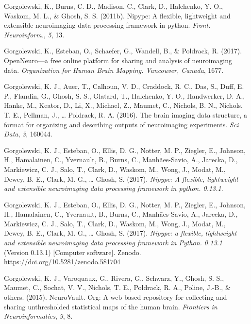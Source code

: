 \documentclass[11pt,american,a4paper,oneside,]{memoir} %
\begin{document}
\leavevmode\hypertarget{ref-Gorgolewski2011-aa}{}%
Gorgolewski, K., Burns, C. D., Madison, C., Clark, D., Halchenko, Y. O., Waskom, M. L., \& Ghosh, S. S. (2011b). Nipype: A flexible, lightweight and extensible neuroimaging data processing framework in python. \emph{Front. Neuroinform.}, \emph{5}, 13.

\leavevmode\hypertarget{ref-Gorgolewski2017-uu}{}%
Gorgolewski, K., Esteban, O., Schaefer, G., Wandell, B., \& Poldrack, R. (2017). OpenNeuro---a free online platform for sharing and analysis of neuroimaging data. \emph{Organization for Human Brain Mapping. Vancouver, Canada}, 1677.

\leavevmode\hypertarget{ref-Gorgolewski2016-in}{}%
Gorgolewski, K. J., Auer, T., Calhoun, V. D., Craddock, R. C., Das, S., Duff, E. P., Flandin, G., Ghosh, S. S., Glatard, T., Halchenko, Y. O., Handwerker, D. A., Hanke, M., Keator, D., Li, X., Michael, Z., Maumet, C., Nichols, B. N., Nichols, T. E., Pellman, J., \ldots{} Poldrack, R. A. (2016). The brain imaging data structure, a format for organizing and describing outputs of neuroimaging experiments. \emph{Sci Data}, \emph{3}, 160044.

\leavevmode\hypertarget{ref-Gorgolewski2017-gb}{}%
Gorgolewski, K. J., Esteban, O., Ellis, D. G., Notter, M. P., Ziegler, E., Johnson, H., Hamalainen, C., Yvernault, B., Burns, C., Manhães-Savio, A., Jarecka, D., Markiewicz, C. J., Salo, T., Clark, D., Waskom, M., Wong, J., Modat, M., Dewey, B. E., Clark, M. G., \ldots{} Ghosh, S. (2017). \emph{Nipype: A flexible, lightweight and extensible neuroimaging data processing framework in python. 0.13.1}.

\leavevmode\hypertarget{ref-gorgolewski_krzysztof_j_2017_581704}{}%
Gorgolewski, K. J., Esteban, O., Ellis, D. G., Notter, M. P., Ziegler, E., Johnson, H., Hamalainen, C., Yvernault, B., Burns, C., Manhães-Savio, A., Jarecka, D., Markiewicz, C. J., Salo, T., Clark, D., Waskom, M., Wong, J., Modat, M., Dewey, B. E., Clark, M. G., \ldots{} Ghosh, S. (2017). \emph{Nipype: a flexible, lightweight and extensible neuroimaging data processing framework in Python. 0.13.1} (Version 0.13.1) {[}Computer software{]}. Zenodo. \url{https://doi.org/10.5281/zenodo.581704}

\leavevmode\hypertarget{ref-gorgolewski2015neurovault}{}%
Gorgolewski, K. J., Varoquaux, G., Rivera, G., Schwarz, Y., Ghosh, S. S., Maumet, C., Sochat, V. V., Nichols, T. E., Poldrack, R. A., Poline, J.-B., \& others. (2015). NeuroVault. Org: A web-based repository for collecting and sharing unthresholded statistical maps of the human brain. \emph{Frontiers in Neuroinformatics}, \emph{9}, 8.
\end{document}
